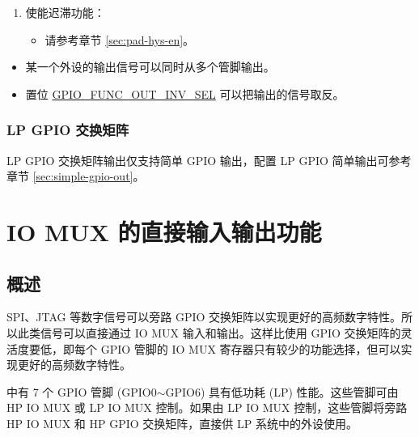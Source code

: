 \documentclass[main\_\_CN.tex]{subfiles}
\begin{document}
\begin{enumerate}
\begin{itemize}
        \item 在开漏模式下，通过置位/清零 \hyperref[fielddesc:IOMUXGPIONFUNWPU]{IO\_MUX\_GPIO\_FUN\_WPU} 和 \hyperref[fielddesc:IOMUXGPIONFUNWPD]{IO\_MUX\_GPIO\_FUN\_WPD} 使能或关闭上拉/下拉电阻。
    \end{itemize}
    \item 使能迟滞功能：
    \begin{itemize}
        \item 请参考章节 \ref{sec:pad-hys-en}。
    \end{itemize}
\end{enumerate}

\begin{tiplisting}
\vspace{-2em}
\begin{itemize}
\item \label{output-note-1} 某一个外设的输出信号可以同时从多个管脚输出。
\item \label{output-note-2} 置位 \hyperref[fielddesc:GPIOFUNCNOUTINVSEL]{GPIO\_FUNC\_OUT\_INV\_SEL} 可以把输出的信号取反。
\end{itemize}
\end{tiplisting}

\subsubsection{LP GPIO 交换矩阵}

LP GPIO 交换矩阵输出仅支持简单 GPIO 输出，配置 LP GPIO 简单输出可参考章节 \ref{sec:simple-gpio-out}。

\section{IO MUX 的直接输入输出功能}

\subsection{概述}

SPI、JTAG 等数字信号可以旁路 GPIO 交换矩阵以实现更好的高频数字特性。所以此类信号可以直接通过 IO MUX 输入和输出。这样比使用 GPIO 交换矩阵的灵活度要低，即每个 GPIO 管脚的 IO MUX 寄存器只有较少的功能选择，但可以实现更好的高频数字特性。

\chipname{} 中有 7 个 GPIO 管脚 (GPIO0$\sim$GPIO6) 具有低功耗 (LP) 性能。这些管脚可由 HP IO MUX 或 LP IO MUX 控制。如果由 LP IO MUX 控制，这些管脚将旁路 HP IO MUX 和 HP GPIO 交换矩阵，直接供 LP 系统中的外设使用。
\end{document}

